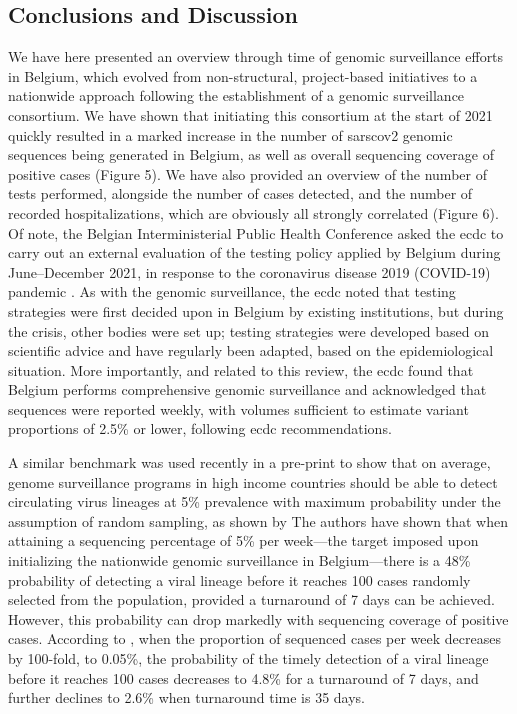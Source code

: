 \subsection{Conclusions and Discussion}
We have here presented an overview through time of genomic surveillance efforts in Belgium, which evolved from non-structural, project-based initiatives to a nationwide approach following the establishment of a genomic surveillance consortium.
We have shown that initiating this consortium at the start of 2021 quickly resulted in a marked increase in the number of \gls{sarscov2} genomic sequences being generated in Belgium, as well as overall sequencing coverage of positive cases (Figure 5).
We have also provided an overview of the number of tests performed, alongside the number of cases detected, and the number of recorded hospitalizations, which are obviously all strongly correlated (Figure 6).
Of note, the Belgian Interministerial Public Health Conference asked the \gls{ecdc} to carry out an external evaluation of the testing policy applied by Belgium during June--December 2021, in response to the coronavirus disease 2019 (COVID-19) pandemic \citep{ecdcBelgiumTesting}.
As with the genomic surveillance, the \gls{ecdc} noted that testing strategies were first decided upon in Belgium by existing institutions, but during the crisis, other bodies were set up; testing strategies were developed based on scientific advice and have regularly been adapted, based on the epidemiological situation.
More importantly, and related to this review, the \gls{ecdc} found that Belgium performs comprehensive genomic surveillance and acknowledged that sequences were reported weekly, with volumes sufficient to estimate variant proportions of 2.5\% or lower, following \gls{ecdc} recommendations.

A similar benchmark was used recently in a pre-print to show that on average, genome surveillance programs in high income countries should be able to detect circulating virus lineages at 5\% prevalence with maximum probability under the assumption of random sampling, as shown by \citet{brito2022global} The authors have shown that when attaining a sequencing percentage of 5\% per week—the target imposed upon initializing the nationwide genomic surveillance in Belgium—there is a 48\% probability of detecting a viral lineage before it reaches 100 cases randomly selected from the population, provided a turnaround of 7 days can be achieved.
However, this probability can drop markedly with sequencing coverage of positive cases.
According to \citet{brito2022global}, when the proportion of sequenced cases per week decreases by 100-fold, to 0.05\%, the probability of the timely detection of a viral lineage before it reaches 100 cases decreases to 4.8\% for a turnaround of 7 days, and further declines to 2.6\% when turnaround time is 35 days.


